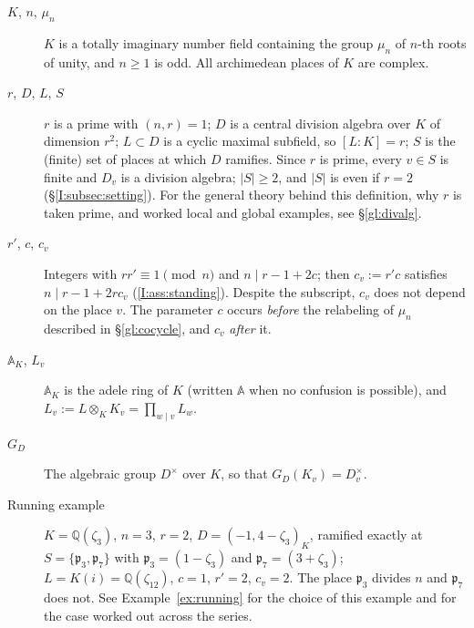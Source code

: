 \begin{description}
\item[$K$, $n$, $\mu_n$] $K$ is a totally imaginary number field
containing the group $\mu_n$ of $n$-th roots of unity, and $n\ge1$ is
odd.  All archimedean places of $K$ are complex.
\item[$r$, $D$, $L$, $S$] $r$ is a prime with $(n,r)=1$; $D$ is a
central division algebra over $K$ of dimension $r^2$; $L\subset D$ is
a cyclic maximal subfield, so $[L:K]=r$; $S$ is the (finite) set of
places at which $D$ ramifies.  Since $r$ is prime, every $v\in S$ is
finite and $D_v$ is a division algebra; $|S|\ge2$, and $|S|$ is even
if $r=2$ (\S\ref{I:subsec:setting}).  For the general theory behind
this definition, why $r$ is taken prime, and worked local and global
examples, see \S\ref{gl:divalg}.
\item[$r'$, $c$, $c_v$] Integers with $rr'\equiv1\pmod n$ and
$n\mid r-1+2c$; then $c_v:=r'c$ satisfies $n\mid r-1+2rc_v$ (\cref{I:ass:standing}).  Despite the subscript, $c_v$ does not depend on the
place $v$.  The parameter $c$ occurs \emph{before} the relabeling of
$\mu_n$ described in \S\ref{gl:cocycle}, and $c_v$ \emph{after} it.
\item[$\mathbb A_K$, $L_v$] $\mathbb A_K$ is the adele ring of $K$
(written $\mathbb A$ when no confusion is possible), and
$L_v:=L\otimes_KK_v=\prod_{w\mid v}L_w$.
\item[$G_D$] The algebraic group $D^\times$ over $K$, so that
$G_D(K_v)=D_v^\times$.
\item[Running example] $K=\mathbb Q(\zeta_3)$, $n=3$, $r=2$,
$D=(-1,4-\zeta_3)_K$, ramified exactly at
$S=\{\mathfrak p_3,\mathfrak p_7\}$ with $\mathfrak p_3=(1-\zeta_3)$
and $\mathfrak p_7=(3+\zeta_3)$; $L=K(i)=\mathbb Q(\zeta_{12})$,
$c=1$, $r'=2$, $c_v=2$.  The place $\mathfrak p_3$ divides $n$ and
$\mathfrak p_7$ does not.  See Example~\ref{ex:running} for the choice
of this example and \cite{JC26b} for the case worked out across
the series.
\end{description}

